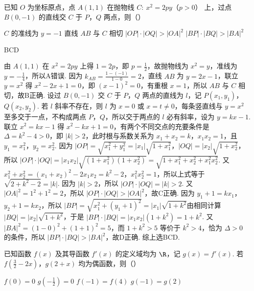\begin{problem}
已知 \(O\) 为坐标原点，点 \(A(1,1)\) 在抛物线 \(C:\ x^2=2py\)（\(p>0\)） 上，过点 \(B(0,-1)\) 的直线交 \(C\) 于 \(P\)，\(Q\) 两点，则（\quad）

\choices
    {\(C\) 的准线为 \(y=-1\)}
    {直线 \(AB\) 与 \(C\) 相切}
    {\(|OP|\cdot |OQ|>|OA|^2\)}
    {\(|BP|\cdot |BQ|>|BA|^2\)}
\end{problem}

\begin{answer}
BCD
\end{answer}

\begin{solution}
由 \(A(1,1)\) 在 \(x^2=2py\) 上得 \(1=2p\)，即 \(p=\frac{1}{2}\)，故抛物线为 \(x^2=y\)，准线为 \(y=-\frac{1}{4}\)，所以A错误. 因为 \(k_{AB}=\frac{1-(-1)}{1-0}=2\)，直线 \(AB\) 为 \(y=2x-1\)，联立 \(y=x^2\) 得 \(x^2-2x+1=0\)，即 \((x-1)^2=0\)，有重根 \(x=1\)，所以 \(AB\) 与 \(C\) 相切，故B正确. 设过 \(B(0,-1)\) 交 \(C\) 于 \(P\)，\(Q\) 两点的直线为 \(l\)，记 \(P(x_1,y_1)\)，\(Q(x_2,y_2)\). 若 \(l\) 斜率不存在，则 \(l\) 为 \(x=0\) 或 \(x=t\ne 0\)，每条竖直线与 \(y=x^2\) 至多交于一点，不构成两点 \(P\)，\(Q\)，所以交于两点的 \(l\) 必有斜率，设为 \(y=kx-1\). 联立 \(x^2=kx-1\) 得 \(x^2-kx+1=0\)，有两个不同交点的充要条件是 \(\Delta=k^2-4>0\)，即 \(\lvert k\rvert>2\)，此时根与系数关系为 \(x_1+x_2=k\)，\(x_1x_2=1\)，且 \(y_1=x_1^2\)，\(y_2=x_2^2\). 因为 \(\lvert OP\rvert=\sqrt{x_1^2+y_1^2}=\lvert x_1\rvert\sqrt{1+x_1^2}\)，\(\lvert OQ\rvert=\lvert x_2\rvert\sqrt{1+x_2^2}\)，所以 \(\lvert OP\rvert\cdot\lvert OQ\rvert=\lvert x_1x_2\rvert\sqrt{(1+x_1^2)(1+x_2^2)}=\sqrt{1+x_1^2+x_2^2+x_1^2x_2^2}\). 又 \(x_1^2+x_2^2=(x_1+x_2)^2-2x_1x_2=k^2-2\)，\(x_1^2x_2^2=1\)，所以上式等于 \(\sqrt{2+k^2-2}=\lvert k\rvert\). 因为 \(\lvert k\rvert>2\)，所以 \(\lvert OP\rvert\cdot\lvert OQ\rvert=\lvert k\rvert>2\). 又 \(\lvert OA\rvert^2=1^2+1^2=2\)，所以 \(\lvert OP\rvert\cdot\lvert OQ\rvert>\lvert OA\rvert^2\)，故C正确. 因为 \(y_1+1=kx_1\)，\(y_2+1=kx_2\)，所以 \(\lvert BP\rvert=\sqrt{x_1^2+(y_1+1)^2}=\lvert x_1\rvert\sqrt{1+k^2}\)由相同计算 \(\lvert BQ\rvert=\lvert x_2\rvert\sqrt{1+k^2}\)，于是 \(\lvert BP\rvert\cdot\lvert BQ\rvert=\lvert x_1x_2\rvert(1+k^2)=1+k^2\). 又 \(\lvert BA\rvert^2=(1-0)^2+(1+1)^2=5\)，而 \(1+k^2>5\) 等价于 \(k^2>4\)，恰为 \(\Delta>0\) 的条件，所以 \(\lvert BP\rvert\cdot\lvert BQ\rvert>\lvert BA\rvert^2\)，故D正确. 综上选BCD.
\end{solution}

\begin{problem}
已知函数 \(f(x)\) 及其导函数 \(f'(x)\) 的定义域均为 \(\R\)，记 \(g(x)=f'(x)\). 若 \(f\left(\frac32-2x\right)\)，\(g(2+x)\) 均为偶函数，则（\quad）

\choices
    {\(f(0)=0\)}
    {\(g\left(-\frac12\right)=0\)}
    {\(f(-1)=f(4)\)}
    {\(g(-1)=g(2)\)}
\end{problem}

